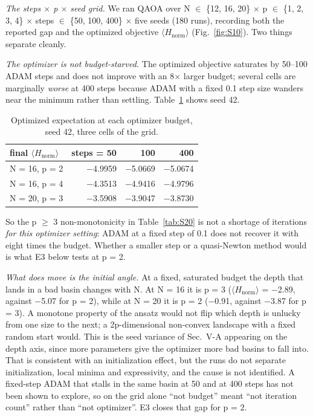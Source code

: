 \documentclass[journal]{IEEEtran}
\begin{document}
\textit{The steps $\times$ p $\times$ seed grid.} We ran QAOA over N $\in$ \{12, 16, 20\} $\times$ p $\in$ \{1, 2, 3, 4\} $\times$ steps $\in$ \{50, 100, 400\} $\times$ five seeds (180 runs), recording both the reported gap and the optimized objective $\langle$$H_{\mathrm{norm}}$$\rangle$ (Fig.~\ref{fig:S10}). Two things separate cleanly.


\textit{The optimizer is not budget-starved.} The optimized objective saturates by 50--100 ADAM steps and does not improve with an 8$\times$ larger budget; several cells are marginally \textit{worse} at 400 steps because ADAM with a fixed 0.1 step size wanders near the minimum rather than settling. Table~\ref{tab:S21} shows seed 42.





\begin{table}[!t]
\centering
\footnotesize
\caption{Optimized expectation at each optimizer budget, seed 42, three cells of the grid.}
\label{tab:S21}
\begin{tabular}{lrrr}
\toprule
final $\langle$$H_{\mathrm{norm}}$$\rangle$ & steps = 50 & 100 & 400 \\
\midrule
N = 16, p = 2 & $-$4.9959 & $-$5.0669 & $-$5.0674 \\
N = 16, p = 4 & $-$4.3513 & $-$4.9416 & $-$4.9796 \\
N = 20, p = 3 & $-$3.5908 & $-$3.9047 & $-$3.8730 \\
\bottomrule
\end{tabular}
\end{table}


So the p $\geq$ 3 non-monotonicity in Table~\ref{tab:S20} is not a shortage of iterations \textit{for this optimizer setting}: ADAM at a fixed step of 0.1 does not recover it with eight times the budget. Whether a smaller step or a quasi-Newton method would is what E3 below tests at p = 2.


\textit{What does move is the initial angle.} At a fixed, saturated budget the depth that lands in a bad basin changes with N. At N = 16 it is p = 3 ($\langle$$H_{\mathrm{norm}}$$\rangle$ = $-$2.89, against $-$5.07 for p = 2), while at N = 20 it is p = 2 ($-$0.91, against $-$3.87 for p = 3). A monotone property of the ansatz would not flip which depth is unlucky from one size to the next; a 2p-dimensional non-convex landscape with a fixed random start would. This is the seed variance of Sec.~V-A appearing on the depth axis, since more parameters give the optimizer more bad basins to fall into. That is consistent with an initialization effect, but the runs do not separate initialization, local minima and expressivity, and the cause is not identified. A fixed-step ADAM that stalls in the same basin at 50 and at 400 steps has not been shown to explore, so on the grid alone ``not budget'' meant ``not iteration count'' rather than ``not optimizer''. E3 closes that gap for p = 2.
\end{document}
